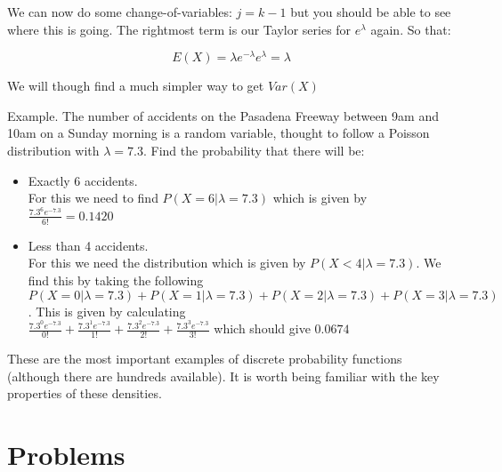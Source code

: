 \documentclass[12pt]{extbook}
\begin{document}
We can now do some change-of-variables: $j=k-1$ but you should be able to see where this is going.   The rightmost term is our Taylor series for $e^{\lambda}$ again.   So that:

\begin{displaymath}
E(X) = \lambda e^{-\lambda} e^{\lambda} = \lambda
\end{displaymath} 

We will though find a much simpler way to get $Var(X)$






Example. The number of accidents on the Pasadena Freeway between 9am and 10am on a Sunday morning is a random variable, thought to follow a Poisson distribution with $\lambda = 7.3$.   Find the probability that there will be:

\begin{itemize}
\item Exactly 6 accidents.\\ For this we need to find $P(X=6|\lambda=7.3)$ which is given by $ \frac{7.3^6e^{-7.3}}{6!} = 0.1420$
\item Less than 4 accidents.\\ For this we need the distribution which is given by  $P(X < 4 |\lambda=7.3)$.   We find this by taking the following\\ $ P(X =0 |\lambda=7.3) + P(X = 1 |\lambda=7.3) + P(X =2  |\lambda=7.3) + P(X =3|\lambda=7.3)$.   This is given by calculating\\ $\frac{7.3^0e^{-7.3}}{0!} + \frac{7.3^1e^{-7.3}}{1!} + \frac{7.3^2e^{-7.3}}{2!} + \frac{7.3^3e^{-7.3}}{3!}$ which should give $0.0674$
\end{itemize}





These are the most important examples of discrete probability functions (although there are hundreds available).   It is worth being familiar with the key properties of these densities.



\section{Problems}

\begin{enumerate}












\end{enumerate}
\end{document}
